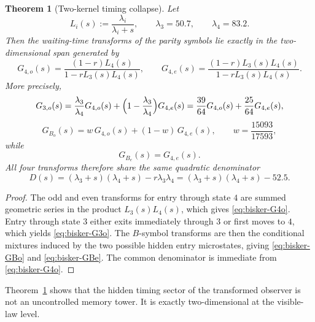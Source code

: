 \documentclass[11pt]{article}
\numberwithin{equation}{section}
\theoremstyle{thmcompact}
\newtheorem{theorem}{Theorem}[section]
\theoremstyle{remark}
\begin{document}
\begin{theorem}[Two-kernel timing collapse]\label{thm:bisker-two-kernel}
Let
\[
L_i(s):=\frac{\lambda_i}{\lambda_i+s},
\qquad
\lambda_3=50.7,
\qquad
\lambda_4=83.2.
\]
Then the waiting-time transforms of the parity symbols lie exactly in the two-dimensional span generated by
\begin{equation}\label{eq:bisker-G4o}
G_{4,o}(s)=\frac{(1-r)L_4(s)}{1-rL_3(s)L_4(s)},
\qquad
G_{4,e}(s)=\frac{(1-r)L_3(s)L_4(s)}{1-rL_3(s)L_4(s)}.
\end{equation}
More precisely,
\begin{equation}\label{eq:bisker-G3o}
G_{3,o}(s)=\frac{\lambda_3}{\lambda_4}G_{4,o}(s)+\Bigl(1-\frac{\lambda_3}{\lambda_4}\Bigr)G_{4,e}(s)
=\frac{39}{64}G_{4,o}(s)+\frac{25}{64}G_{4,e}(s),
\end{equation}
\begin{equation}\label{eq:bisker-GBo}
G_{B_o}(s)=w\,G_{4,o}(s)+(1-w)\,G_{4,e}(s),
\qquad
w=\frac{15093}{17593},
\end{equation}
while
\begin{equation}\label{eq:bisker-GBe}
G_{B_e}(s)=G_{4,e}(s).
\end{equation}
All four transforms therefore share the same quadratic denominator
\begin{equation}\label{eq:bisker-common-den}
D(s)=(\lambda_3+s)(\lambda_4+s)-r\lambda_3\lambda_4=(\lambda_3+s)(\lambda_4+s)-52.5.
\end{equation}
\end{theorem}

\begin{proof}
The odd and even transforms for entry through state $4$ are summed geometric series in the product $L_3(s)L_4(s)$, which gives \eqref{eq:bisker-G4o}. Entry through state $3$ either exits immediately through $3$ or first moves to $4$, which yields \eqref{eq:bisker-G3o}. The $B$-symbol transforms are then the conditional mixtures induced by the two possible hidden entry microstates, giving \eqref{eq:bisker-GBo} and \eqref{eq:bisker-GBe}. The common denominator is immediate from \eqref{eq:bisker-G4o}.
\end{proof}

Theorem~\ref{thm:bisker-two-kernel} shows that the hidden timing sector of the transformed observer is not an uncontrolled memory tower. It is exactly two-dimensional at the visible-law level.
\end{document}
